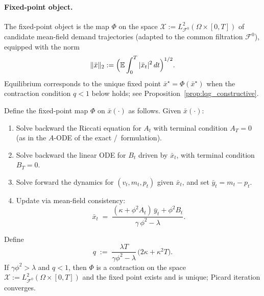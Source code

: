 \paragraph{Fixed-point object.}
The fixed-point object is the map $\Phi$ on the space $\mathcal X := L^2_{\mathcal F^0}(\Omega\times[0,T])$ of candidate mean-field demand trajectories (adapted to the common filtration $\mathcal F^0$), equipped with the norm
\[
\|\bar x\|_2 := \Big(\mathbb{E}\int_0^T |\bar x_t|^2\,dt\Big)^{1/2}.
\]
Equilibrium corresponds to the unique fixed point $\bar x^\star = \Phi(\bar x^\star)$ when the contraction condition $q<1$ below holds; see Proposition~\ref{prop:lqg_constructive}.

\begin{proposition}
\label{prop:lqg_constructive}
Define the fixed-point map $\Phi$ on $\bar x(\cdot)$ as follows. Given $\bar x(\cdot)$:
\begin{enumerate}[label=(\roman*)]
\item Solve backward the Riccati equation for $A_t$ with terminal condition $A_T=0$ (as in the $A$-ODE of the exact \CARA/\LQG\ formulation).
\item Solve backward the linear ODE for $B_t$ driven by $\bar x_t$, with terminal condition $B_T=0$.
\item Solve forward the dynamics for $(v_t,m_t,p_t)$ given $\bar x_t$, and set $\bar y_t = m_t - p_t$.
\item Update via mean-field consistency:
\begin{equation}
\bar x_t \;=\; \frac{(\kappa + \phi^2 A_t)\,\bar y_t + \phi^2 B_t}{\gamma\,\phi^2 - \lambda}.
\label{eq:barx_update}
\end{equation}
\end{enumerate}
Define
\begin{equation}
q \;:=\; \frac{\lambda T}{\gamma\phi^2-\lambda}\,\bigl(2\kappa+\kappa^2 T\bigr).
\label{eq:q_contract}
\end{equation}
If $\gamma\phi^2>\lambda$ and $q<1$, then $\Phi$ is a contraction on the space $\mathcal X := L^2_{\mathcal F^0}(\Omega\times[0,T])$ and the fixed point exists and is unique; Picard iteration converges.
\end{proposition}

